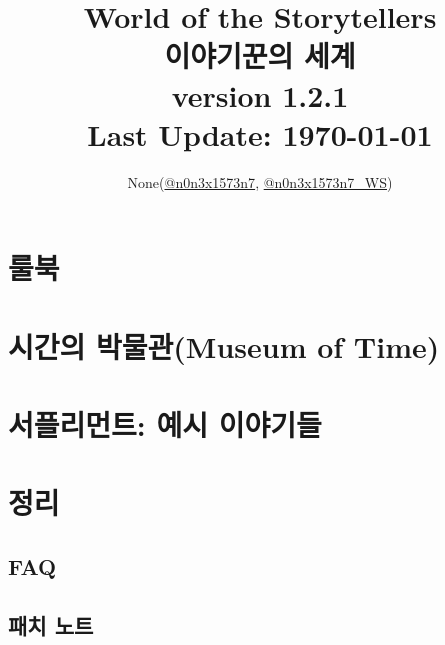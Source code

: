 \documentclass[12pt]{report}
\title{
	World of the Storytellers\\
	이야기꾼의 세계\\
	\large version 1.2.1\\
	Last Update: \today \\
}
\author{None(\href{https://www.twitter.com/n0n3x1573n7}{@n0n3x1573n7}, \href{https://www.twitter.com/n0n3x1573n7_WS}{@n0n3x1573n7\_WS})}
\date{}
\begin{document}
	\maketitle

	\vspace*{\fill}
	{\doclicenseThis}
	
	\setcounter{tocdepth}{-1}
	
\iffalse
	\chapter*{서론}
		
\fi
	
	\tableofcontents
	
	\part{룰북}
		
	
	\part{시간의 박물관(Museum of Time)}
		
	
	\part{서플리먼트: 예시 이야기들} \label{endof_MoT}
		
	
	\part{정리}
		\chapter*{FAQ}
			
	
		\chapter*{패치 노트}
			
	
	\newpage
	\vspace*{\fill}
	{\doclicenseThis}
	
\end{document}
